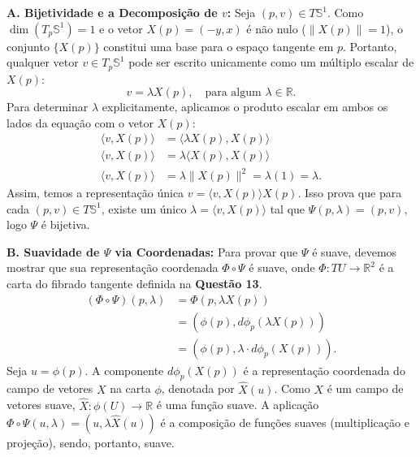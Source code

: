 {	\textbf{A. Bijetividade e a Decomposição de $v$:}
	Seja $(p, v) \in T\mathbb{S}^1$. Como $\dim(T_p\mathbb{S}^1) = 1$ e o vetor $X(p) = (-y, x)$ é não nulo ($\|X(p)\| = 1$), o conjunto $\{X(p)\}$ constitui uma base para o espaço tangente em $p$. Portanto, qualquer vetor $v \in T_p\mathbb{S}^1$ pode ser escrito unicamente como um múltiplo escalar de $X(p)$:
	\begin{equation*}
		v = \lambda X(p), \quad \text{para algum } \lambda \in \mathbb{R}.
	\end{equation*}
	Para determinar $\lambda$ explicitamente, aplicamos o produto escalar em ambos os lados da equação com o vetor $X(p)$:
	\begin{align*}
		\langle v, X(p) \rangle &= \langle \lambda X(p), X(p) \rangle \\
		\langle v, X(p) \rangle &= \lambda \langle X(p), X(p) \rangle \\
		\langle v, X(p) \rangle &= \lambda \|X(p)\|^2 = \lambda (1) = \lambda.
	\end{align*}
	Assim, temos a representação única $v = \langle v, X(p) \rangle X(p)$. Isso prova que para cada $(p, v) \in T\mathbb{S}^1$, existe um único $\lambda = \langle v, X(p) \rangle$ tal que $\Psi(p, \lambda) = (p, v)$, logo $\Psi$ é bijetiva.
	
	\textbf{B. Suavidade de $\Psi$ via Coordenadas:}
	Para provar que $\Psi$ é suave, devemos mostrar que sua representação coordenada $\Phi \circ \Psi$ é suave, onde $\Phi : T U \to \mathbb{R}^2$ é a carta do fibrado tangente definida na \textbf{Questão 13}.
	\begin{align*}
		(\Phi \circ \Psi)(p, \lambda) &= \Phi(p, \lambda X(p)) \\
		&= (\phi(p), d\phi_p(\lambda X(p))) \\
		&= (\phi(p), \lambda \cdot d\phi_p(X(p))).
	\end{align*}
	Seja $u = \phi(p)$. A componente $d\phi_p(X(p))$ é a representação coordenada do campo de vetores $X$ na carta $\phi$, denotada por $\hat{X}(u)$. Como $X$ é um campo de vetores suave, $\hat{X} : \phi(U) \to \mathbb{R}$ é uma função suave. A aplicação $\Phi \circ \Psi(u, \lambda) = (u, \lambda \hat{X}(u))$ é a composição de funções suaves (multiplicação e projeção), sendo, portanto, suave.
	
}
